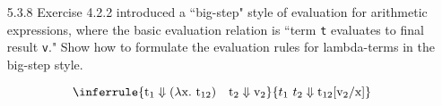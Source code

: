 \documentclass[12pt]{article}
\newcommand{\mt}[1]{\ensuremath{\text{#1}}}
\newcommand{\abstr}[1]{\lambda #1.\ }
\begin{document}
\begin{enumerate}
\newpage

\item[5.3.8] Exercise 4.2.2 introduced a ``big-step" style of evaluation for
arithmetic expressions, where the basic evaluation relation is ``term \texttt{t} evaluates to final result \texttt{v}." Show how to formulate the evaluation rules for lambda-terms in the big-step style.

$$
\inferrule{
  \mt{t}_1 \Downarrow (\abstr{\mt{x}} \mt{t}_{12}) \quad \mt{t}_2 \Downarrow \mt{v}_2
}{ t_1 \ t_2 \Downarrow \mt{t}_{12}[\mt{v}_2/\mt{x}]
}
$$

\end{enumerate}

\newpage
\end{document}
